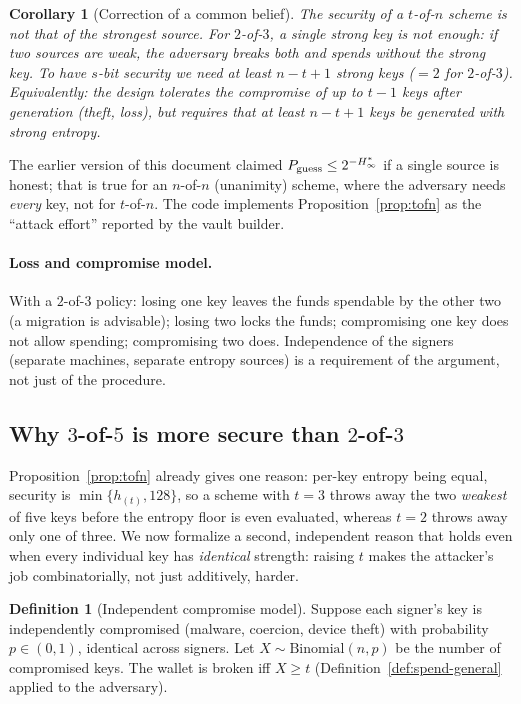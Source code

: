 \documentclass[11pt,a4paper]{article}
\theoremstyle{plain}
\newtheorem{corollary}[theorem]{Corollary}
\theoremstyle{definition}
\newtheorem{definition}[theorem]{Definition}
\begin{document}
\begin{corollary}[Correction of a common belief]
The security of a $t$-of-$n$ scheme is \emph{not} that of the strongest
source. For $2$-of-$3$, a single strong key is not enough: if two sources are
weak, the adversary breaks both and spends without the strong key. To have
$s$-bit security we need at least $n-t+1$ strong keys ($=2$ for $2$-of-$3$).
Equivalently: the design tolerates the compromise of up to $t-1$ keys
\emph{after} generation (theft, loss), but requires that at least $n-t+1$ keys
be generated with strong entropy.
\end{corollary}

The earlier version of this document claimed
$P_{\rm guess}\le2^{-H^\ast_\infty}$ if a single source is honest; that is true
for an $n$-of-$n$ (unanimity) scheme, where the adversary needs \emph{every}
key, not for $t$-of-$n$. The code implements
Proposition~\ref{prop:tofn} as the ``attack effort'' reported by the vault
builder.

\paragraph{Loss and compromise model.} With a $2$-of-$3$ policy: losing one key
leaves the funds spendable by the other two (a migration is advisable); losing
two locks the funds; compromising one key does not allow spending; compromising
two does. Independence of the signers (separate machines, separate entropy
sources) is a requirement of the argument, not just of the procedure.

\subsection{Why $3$-of-$5$ is more secure than $2$-of-$3$}
\label{sec:2of3-vs-3of5}

Proposition~\ref{prop:tofn} already gives one reason: per-key entropy being
equal, security is $\min\{h_{(t)},128\}$, so a scheme with $t=3$ throws away
the two \emph{weakest} of five keys before the entropy floor is even
evaluated, whereas $t=2$ throws away only one of three. We now formalize a
second, independent reason that holds even when every individual key has
\emph{identical} strength: raising $t$ makes the attacker's job
combinatorially, not just additively, harder.

\begin{definition}[Independent compromise model]
Suppose each signer's key is independently compromised (malware, coercion,
device theft) with probability $p\in(0,1)$, identical across signers. Let
$X\sim\mathrm{Binomial}(n,p)$ be the number of compromised keys. The wallet is
broken iff $X\ge t$ (Definition~\ref{def:spend-general} applied to the
adversary).
\end{definition}
\end{document}
